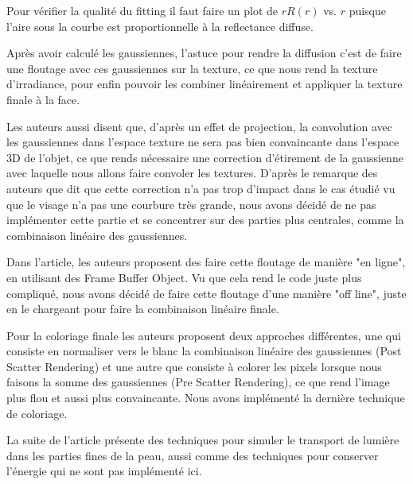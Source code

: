 \documentclass[12pt,a4paper]{article}
\begin{document}
Pour vérifier la qualité du fitting il faut faire un plot de $rR(r)$ vs. $r$ puisque l'aire sous la courbe est proportionnelle à la reflectance diffuse. 

Après avoir calculé les gaussiennes, l'astuce pour rendre la diffusion c'est de faire une floutage avec ces gaussiennes sur la texture, ce que nous rend la texture d'irradiance, pour enfin pouvoir les combiner linéairement et appliquer la texture finale à la face.

Les auteurs aussi disent que, d'après un effet de projection, la convolution avec les gaussiennes dans l'espace texture ne sera pas bien convaincante dans l'espace 3D de l'objet, ce que rends nécessaire une correction d'étirement de la gaussienne avec laquelle nous allons faire convoler les textures. D'après le remarque des auteurs que dit que cette correction n'a pas trop d'impact dans le cas étudié vu que le visage n'a pas une courbure très grande, nous avons décidé de ne pas implémenter cette partie et se concentrer sur des parties plus centrales, comme la combinaison linéaire des gaussiennes.

Dans l'article, les auteurs proposent des faire cette floutage de manière "en ligne", en utilisant des Frame Buffer Object. Vu que cela rend le code juste plus compliqué, nous avons décidé de faire cette floutage d'une manière "off line", juste en le chargeant pour faire la combinaison linéaire finale.

Pour la coloriage finale les auteurs proposent deux approches différentes, une qui consiste en normaliser vers le blanc la combinaison linéaire des gaussiennes (Post Scatter Rendering) et une autre que consiste à colorer les pixels lorsque nous faisons la somme des gaussiennes (Pre Scatter Rendering), ce que rend l'image plus flou et aussi plus convaincante. Nous avons implémenté la dernière technique de coloriage.

La suite de l'article présente des techniques pour simuler le transport de lumière dans les parties fines de la peau, aussi comme des techniques pour conserver l'énergie qui ne sont pas implémenté ici. 
\end{document}
